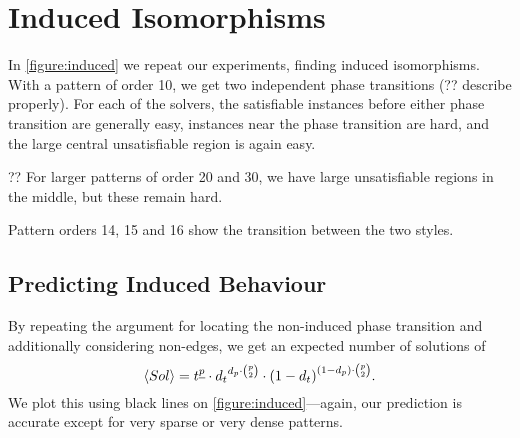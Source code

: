 \documentclass[letterpaper]{article}
\begin{document}
\section{Induced Isomorphisms}

\begin{figure*}[p]
    
    \caption{Behaviour of algorithms on the induced variant, shown in the style
    of \cref{figure:non-induced}. The second, third and fourth rows show the number of search nodes used by the
    Glasgow, LAD and VF2 algorithms. The fifth row shows a bound on the satisfiable region, by
    considering where a \emph{non-}induced isomorphism may also be a non-induced isomorphism between
    complement graphs. The sixth row plots constrainedness: the darkest region is where
    constrainedness is exactly one, and the lighter regions show where the problem is either over-
    or under-constrained. The final row shows when the Glasgow algorithm performs better when given
    the complements of the pattern and target graphs as
inputs.}\label{figure:induced}
\end{figure*}

In \cref{figure:induced} we repeat our experiments, finding induced isomorphisms. With a pattern of
order 10, we get two independent phase transitions (?? describe properly). For each of the solvers,
the satisfiable instances before either phase transition are generally easy, instances near the
phase transition are hard, and the large central unsatisfiable region is again easy.

?? For larger patterns of order 20 and 30, we have large unsatisfiable regions in the middle,
but these remain hard.

Pattern orders 14, 15 and 16 show the transition between the two styles.

\subsection{Predicting Induced Behaviour}

By repeating the argument for locating the non-induced phase transition and additionally considering
non-edges, we get an expected number of solutions of \[ \langle Sol \rangle = t^{\underline{p}}
    \cdot {d_t}^{d_p \cdot \binom{p}{2}} \cdot {(1 - d_{t})}^{(1 - d_{p}) \cdot \binom{p}{2}}
\textnormal{.} \] We plot this
using black lines on \cref{figure:induced}---again, our prediction is accurate except for very
sparse or very dense patterns.
\end{document}
